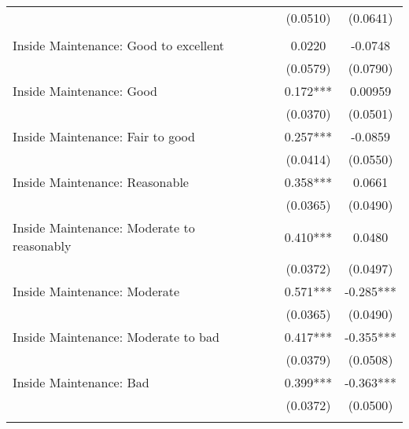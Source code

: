 \documentclass[12pt]{article}
\begin{document}
\begin{table}[H]
\begin{tabular}{lcccc}
                                &            &             & (0.0510)    & (0.0641)     \\
            &            &             &             &              \\
Inside Maintenance: Good to excellent               &            &             & 0.0220      & -0.0748      \\
                                &            &             & (0.0579)    & (0.0790)     \\
Inside Maintenance: Good                            &            &             & 0.172***    & 0.00959      \\
                                &            &             & (0.0370)    & (0.0501)     \\
Inside Maintenance: Fair to good                    &            &             & 0.257***    & -0.0859      \\
                                &            &             & (0.0414)    & (0.0550)     \\
Inside Maintenance: Reasonable                      &            &             & 0.358***    & 0.0661       \\
                                &            &             & (0.0365)    & (0.0490)     \\
Inside Maintenance: Moderate to reasonably          &            &             & 0.410***    & 0.0480       \\
                                &            &             & (0.0372)    & (0.0497)     \\
Inside Maintenance: Moderate                        &            &             & 0.571***    & -0.285***    \\
                                &            &             & (0.0365)    & (0.0490)     \\
Inside Maintenance: Moderate to bad                 &            &             & 0.417***    & -0.355***    \\
                                &            &             & (0.0379)    & (0.0508)     \\
Inside Maintenance: Bad                             &            &             & 0.399***    & -0.363***    \\
                                &            &             & (0.0372)    & (0.0500)     \\
            &            &             &             &              \\

\end{tabular}
\end{table}
\end{document}
